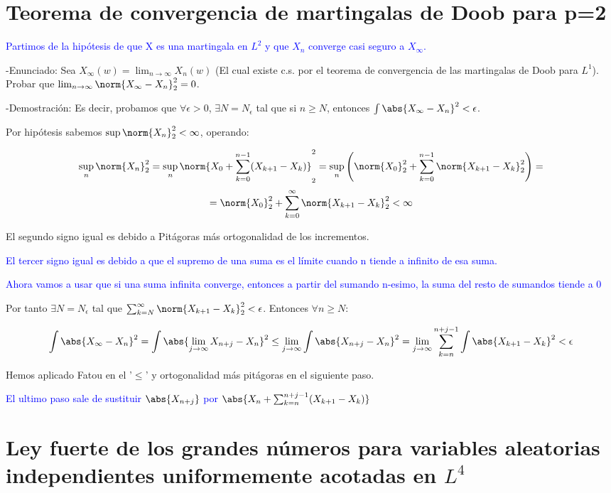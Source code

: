 \documentclass{apuntes}
\begin{document}
\section{Teorema de convergencia de martingalas de Doob para p=2}
\textcolor{blue}{Partimos de la hipótesis de que X es una martingala en $L^2$ y que $X_n$ converge casi seguro a $X_{\infty}$.}

-Enunciado: Sea $X_{\infty}(w)=\lim_{n \rightarrow \infty} X_n(w)$ (El cual existe c.s. por el teorema de convergencia de las martingalas de Doob para $L^1$). Probar que $\lim_{n \rightarrow \infty}\norm{X_{\infty}-X_n}_2^2=0$.


-Demostración: Es decir, probamos que $\forall \epsilon > 0$, $\exists N = N_{\epsilon}$ tal que si $n\geq N$, entonces $\int \abs{X_{\infty}-X_n}^2 < \epsilon$.

Por hipótesis sabemos $\sup \norm{X_n}_2^2 < \infty$, operando:

\[
\sup_n \norm{X_n}_2^2 = \sup_n \norm{X_0 +\sum_{k=0}^{n-1}(X_{k+1}-X_k)}_2^2 = \sup_n \left( \norm{X_0}_2^2 +\sum_{k=0}^{n-1}\norm{X_{k+1}-X_k}_2^2 \right) =
\]
\[
= \norm{X_0}_2^2 +\sum_{k=0}^{\infty}\norm{X_{k+1}-X_k}_2^2 < \infty
\]

El segundo signo igual es debido a Pitágoras más ortogonalidad de los incrementos.

\textcolor{blue}{El tercer signo igual es debido a que el supremo de una suma es el límite cuando n tiende a infinito de esa suma.}

\textcolor{blue}{Ahora vamos a usar que si una suma infinita converge, entonces a partir del sumando n-esimo, la suma del resto de sumandos tiende a 0}

Por tanto $\exists N = N_{\epsilon}$ tal que $\sum_{k=N}^{\infty} \norm{X_{k+1}-X_k}_2^2 < \epsilon$. Entonces $\forall n \geq N$:

\[
\int \abs{X_{\infty}-X_n}^2 = \int \abs{\lim_{j \rightarrow \infty} X_{n+j}-X_n}^2 \leq \lim_{j \rightarrow \infty} \int \abs{ X_{n+j}-X_n}^2 = \lim_{j \rightarrow \infty} \sum_{k=n}^{n+j-1}\int \abs{X_{k+1}-X_k}^2 < \epsilon
\]

Hemos aplicado Fatou en el '$\leq$' y ortogonalidad más pitágoras en el siguiente paso.


\textcolor{blue}{El ultimo paso sale de sustituir $\abs{X_{n+j}}$ por $\abs{X_n + \sum_{k=n}^{n+j-1}(X_{k+1}-X_k)}$}


\section{Ley fuerte de los grandes números para variables aleatorias independientes uniformemente acotadas en $L^4$}
\end{document}
